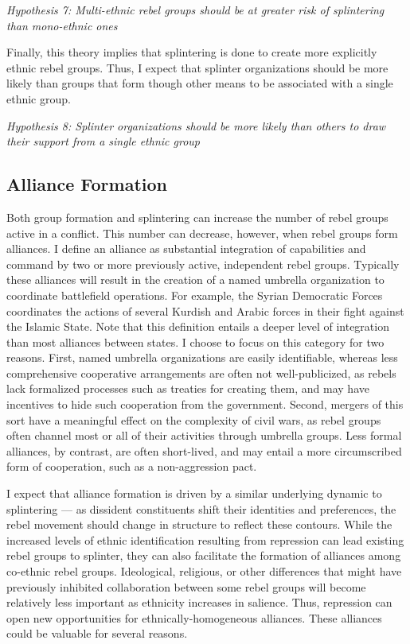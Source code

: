 \documentclass[12pt,]{book}
\theoremstyle{definition}
\theoremstyle{definition}
\theoremstyle{definition}
\theoremstyle{remark}
\begin{document}
\emph{Hypothesis 7: Multi-ethnic rebel groups should be at greater risk
of splintering than mono-ethnic ones}

Finally, this theory implies that splintering is done to create more
explicitly ethnic rebel groups. Thus, I expect that splinter
organizations should be more likely than groups that form though other
means to be associated with a single ethnic group.

\emph{Hypothesis 8: Splinter organizations should be more likely than
others to draw their support from a single ethnic group}

\hypertarget{alliance-formation-1}{%
\subsection{Alliance Formation}\label{alliance-formation-1}}

Both group formation and splintering can increase the number of rebel
groups active in a conflict. This number can decrease, however, when
rebel groups form alliances. I define an alliance as substantial
integration of capabilities and command by two or more previously
active, independent rebel groups. Typically these alliances will result
in the creation of a named umbrella organization to coordinate
battlefield operations. For example, the Syrian Democratic Forces
coordinates the actions of several Kurdish and Arabic forces in their
fight against the Islamic State. Note that this definition entails a
deeper level of integration than most alliances between states. I choose
to focus on this category for two reasons. First, named umbrella
organizations are easily identifiable, whereas less comprehensive
cooperative arrangements are often not well-publicized, as rebels lack
formalized processes such as treaties for creating them, and may have
incentives to hide such cooperation from the government. Second, mergers
of this sort have a meaningful effect on the complexity of civil wars,
as rebel groups often channel most or all of their activities through
umbrella groups. Less formal alliances, by contrast, are often
short-lived, and may entail a more circumscribed form of cooperation,
such as a non-aggression pact.

I expect that alliance formation is driven by a similar underlying
dynamic to splintering --- as dissident constituents shift their
identities and preferences, the rebel movement should change in
structure to reflect these contours. While the increased levels of
ethnic identification resulting from repression can lead existing rebel
groups to splinter, they can also facilitate the formation of alliances
among co-ethnic rebel groups. Ideological, religious, or other
differences that might have previously inhibited collaboration between
some rebel groups will become relatively less important as ethnicity
increases in salience. Thus, repression can open new opportunities for
ethnically-homogeneous alliances. These alliances could be valuable for
several reasons.
\end{document}
